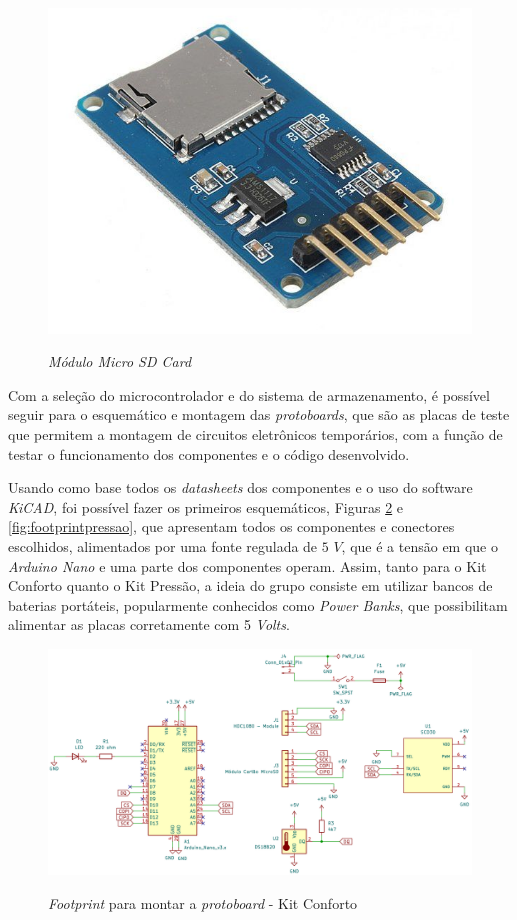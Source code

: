 \documentclass[acronym,symbols,table]{fei}
\begin{document}
\begin{figure}[!htb]
\centering
    \caption{\textit{Módulo Micro SD Card}}
    \includegraphics[width=0.3\linewidth]{Imagens/microsd.png}
    \label{fig:FotomicroSD}
\end{figure}

Com a seleção do microcontrolador e do sistema de armazenamento, é possível seguir para o esquemático e montagem das \textit{protoboards}, que são as placas de teste que permitem a montagem de circuitos eletrônicos temporários, com a função de testar o funcionamento dos componentes e o código desenvolvido.

Usando como base todos os \textit{datasheets} dos componentes e o uso do software \textit{KiCAD}, foi possível fazer os primeiros esquemáticos, Figuras \ref{fig:footprintprotoboardint} e \ref{fig:footprintpressao}, que apresentam todos os componentes e conectores escolhidos, alimentados por uma fonte regulada de $5$ $V$, que é a tensão em que o \textit{Arduino Nano} e uma parte dos componentes operam. Assim, tanto para o Kit Conforto quanto o Kit Pressão, a ideia do grupo consiste em utilizar bancos de baterias portáteis, popularmente conhecidos como \textit{Power Banks}, que possibilitam alimentar as placas corretamente com 5 \textit{Volts}.

\begin{figure}[!htb]
\centering
    \caption{\textit{Footprint} para montar a \textit{protoboard} - Kit Conforto}
    \includegraphics[width=1\linewidth]{Imagens/footprintprotoboardint.png}
    \label{fig:footprintprotoboardint}
\end{figure}
\end{document}
